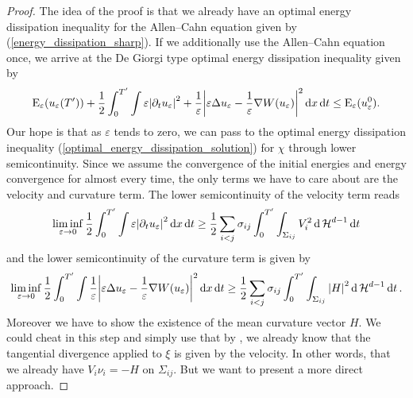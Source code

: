 \begin{proof}
	The idea of the proof is that we already have an optimal energy dissipation 
	inequality for the Allen--Cahn equation given by 
	(\ref{energy_dissipation_sharp}).
	If we additionally use the Allen--Cahn equation once, we arrive at 
	the De Giorgi type optimal energy dissipation inequality given 
	by
	\begin{equation*}
	\label{energy_dissipation_sharp_with_curvature}
	\operatorname{E}_{ \varepsilon } ( u_{ \varepsilon } ( T' ) )
	+
	\frac{ 1 }{ 2 }
	\int_{ 0 }^{ T' }
		\int
			\varepsilon \abs{ \partial_{ t } u_{ \varepsilon } }^{ 2 }
			+
			\frac{ 1 }{ \varepsilon }
			\abs{
				\varepsilon \Delta u_{ \varepsilon } 
				-
				\frac{ 1 }{ \varepsilon } \nabla W ( u_{ \varepsilon } )
			}^{ 2 }
		\dd{ x }
	\dd{ t }
	\leq
	\operatorname{E}_{ \varepsilon } ( u_{ \varepsilon}^{ 0 } ).
	\end{equation*}
	Our hope is that as $ \varepsilon $ tends to zero, we can pass to the 
	optimal energy dissipation inequality 
	(\ref{optimal_energy_dissipation_solution}) for $ \chi $ through lower 
	semicontinuity. 
	Since we assume the convergence of the initial energies and energy 
	convergence for almost every time, the only terms we have to care about are
	the velocity and curvature term. 
	The lower semicontinuity of the velocity term reads
	\begin{equation}
		\label{lsc_of_velocity}
		\liminf_{ \varepsilon \to 0 }
			\frac{ 1 }{ 2 }
			\int_{ 0 }^{ T' }
				\int
					\varepsilon 
					\abs{ \partial_{ t } u_{ \varepsilon } }^{ 2 }
				\dd{ x }
			\dd{ t }
		\geq
		\frac{ 1 }{ 2 }
		\sum_{ i < j  }
			\sigma_{ i j }
			\int_{ 0 }^{ T' }
				\int_{ \Sigma_{ i j } }
					V_{ i }^{ 2 }
				\dd{ \operatorname{\mathcal{H}}^{ d - 1 } }
			\dd{ t }
	\end{equation}
	and the lower semicontinuity of the curvature term is given by
	\begin{equation}
		\label{lsc_of_curvature}
		\liminf_{ \varepsilon \to 0 }
			\frac{ 1 }{ 2 }
			\int_{ 0 }^{ T' }
				\int
					\frac{ 1 }{ \varepsilon }
					\abs{
						\varepsilon
						\Delta u_{ \varepsilon }
						-
						\frac{ 1 }{ \varepsilon }
						\nabla W ( u_{ \varepsilon } ) 
					}^{ 2 }
				\dd{ x }
			\dd{ t }
		\geq
		\frac{ 1 }{ 2 }
		\sum_{ i < j  }
			\sigma_{ i j }
			\int_{ 0 }^{ T' }
				\int_{ \Sigma_{ i j } }
					\abs{ H }^{ 2 }
				\dd{ \operatorname{\mathcal{H}}^{ d - 1 } }
			\dd{ t }.
	\end{equation}
	Moreover we have to show the existence of the mean curvature vector $ H $.
	We could cheat in this step and simply use that by 
	, we already know that the tangential 
	divergence applied to $ \xi $ is given by the velocity. In other words, 
	that we already have $ V_{ i } \nu_{ i } = -H $ on $ \Sigma_{ i j } $. But 
	we want 
	to present a more direct approach.
	

\end{proof}
